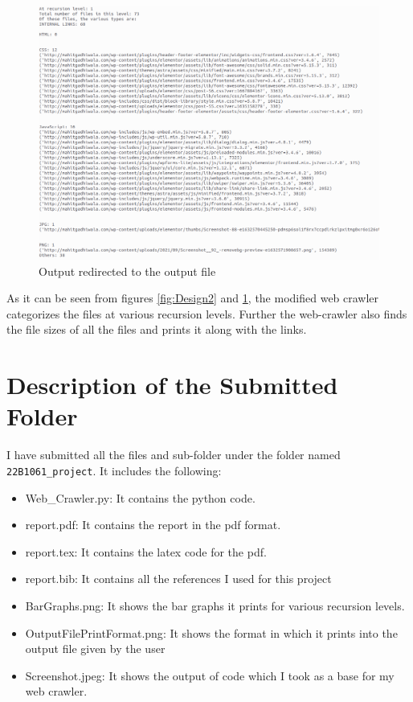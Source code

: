 \documentclass{article}
\begin{document}
 

\begin{figure}[H]
    \centering
    \includegraphics[scale=0.3]{OutputFilePrintFormat.png}
    \caption{Output redirected to the output file}
    \label{fig:Design3}
\end{figure}
As it can be seen from figures \ref{fig:Design2} and \ref{fig:Design3}, the modified web crawler categorizes the files at various recursion levels. Further the web-crawler also finds the file sizes of all the files and prints it along with the links.


\section*{Description of the Submitted Folder}
I have submitted all the files and sub-folder under the folder named \texttt{22B1061\_project}. It includes the following:
\begin{itemize}
\item{Web\_Crawler.py}: It contains the python code.
\item{report.pdf}: It contains the report in the pdf format.
\item{report.tex}: It contains the latex code for the pdf.
\item{report.bib}: It contains all the references I used for this project
\item{BarGraphs.png}: It shows the bar graphs it prints for various recursion levels.
\item{OutputFilePrintFormat.png}: It shows the format in which it prints into the output file given by the user
\item{Screenshot.jpeg}: It shows the output of code which I took as a base for my web crawler.
\end{itemize}

\printbibliography
\end{document}
